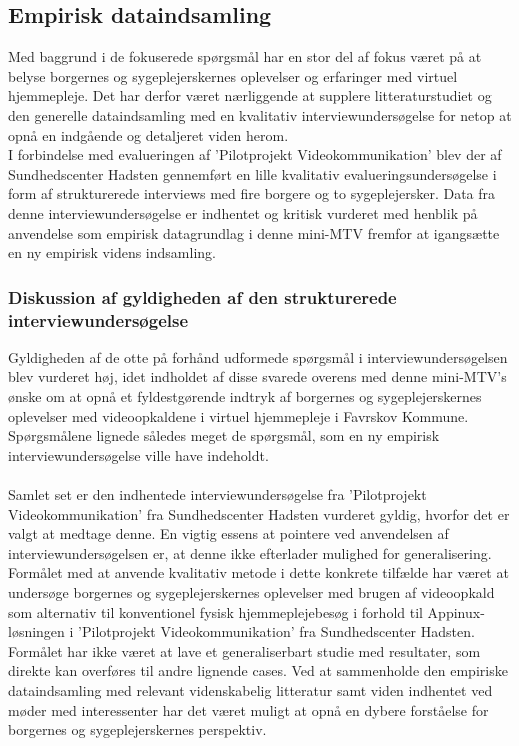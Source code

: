 \subsection{Empirisk dataindsamling}
Med baggrund i de fokuserede spørgsmål har en stor del af fokus været på at belyse borgernes og sygeplejerskernes oplevelser og erfaringer med virtuel hjemmepleje. Det har derfor været nærliggende at supplere litteraturstudiet og den generelle dataindsamling med en kvalitativ interviewundersøgelse for netop at opnå en indgående og detaljeret viden herom.\\
I forbindelse med evalueringen af ’Pilotprojekt Videokommunikation’ blev der af Sundhedscenter Hadsten gennemført en lille kvalitativ evalueringsundersøgelse i form af strukturerede interviews med fire borgere og to sygeplejersker. Data fra denne interviewundersøgelse er indhentet og kritisk vurderet med henblik på anvendelse som empirisk datagrundlag i denne mini-MTV fremfor at igangsætte en ny empirisk videns indsamling.
\subsubsection{Diskussion af gyldigheden af den strukturerede interviewundersøgelse}
Gyldigheden af de otte på forhånd udformede spørgsmål i interviewundersøgelsen blev vurderet høj, idet indholdet af disse svarede overens med denne mini-MTV’s ønske om at opnå et fyldestgørende indtryk af borgernes og sygeplejerskernes oplevelser med videoopkaldene i virtuel hjemmepleje i Favrskov Kommune. Spørgsmålene lignede således meget de spørgsmål, som en ny empirisk interviewundersøgelse ville have indeholdt.\\ \\
Samlet set er den indhentede interviewundersøgelse fra ’Pilotprojekt Videokommunikation’ fra Sundhedscenter Hadsten vurderet gyldig, hvorfor det er valgt at medtage denne. En vigtig essens at pointere ved anvendelsen af interviewundersøgelsen er, at denne ikke efterlader mulighed for generalisering. Formålet med at anvende kvalitativ metode i dette konkrete tilfælde har været at undersøge borgernes og sygeplejerskernes oplevelser med brugen af videoopkald som alternativ til konventionel fysisk hjemmeplejebesøg i forhold til Appinux-løsningen i ’Pilotprojekt Videokommunikation’ fra Sundhedscenter Hadsten. Formålet har ikke været at lave et generaliserbart studie med resultater, som direkte kan overføres til andre lignende cases. Ved at sammenholde den empiriske dataindsamling med relevant videnskabelig litteratur samt viden indhentet ved møder med interessenter har det været muligt at opnå en dybere forståelse for borgernes og sygeplejerskernes perspektiv. 

